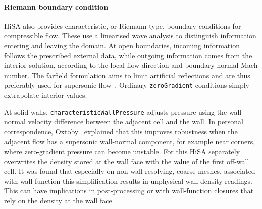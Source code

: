 \paragraph*{Riemann boundary condition}
HiSA also provides characteristic, or Riemann-type, boundary conditions for
compressible flow. These use a linearised wave analysis to distinguish
information entering and leaving the domain. At open boundaries, incoming
information follows the prescribed external data, while outgoing information
comes from the interior solution, according to the local flow direction and
boundary-normal Mach number. The farfield formulation aims to limit
artificial reflections and are thus preferably used for supersonic flow~\cite[Section~2.1]{HeynsOxtoby2021HiSAUserGuide}. Ordinary \texttt{zeroGradient} conditions simply extrapolate interior values.
\par\medskip

At solid walls, \texttt{characteristicWallPressure} adjusts pressure using
the wall-normal velocity difference between the adjacent cell and the wall.
In personal correspondence, Oxtoby~\cite{Oxtoby2026CharacteristicWallPressure}
explained that this improves robustness when the adjacent flow has a
supersonic wall-normal component, for example near corners, where
zero-gradient pressure can become unstable. For this HiSA separately overwrites the
density stored at the wall face with the value of the first off-wall cell. It was found that especially on non-wall-resolving, coarse meshes, associated with wall-function this simplification results in unphysical wall density readings. This can have implications in post-processing or with wall-function closures that rely on the density at the wall face.
